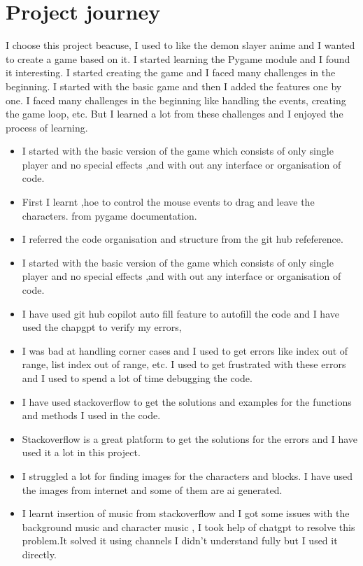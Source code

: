 \documentclass[12pt]{article}
\begin{document}
\section{Project journey}
I choose this project beacuse, I used to like the demon slayer anime and I wanted to create a game based on it. I started learning the Pygame module and I found it interesting. I started creating the game and I faced many challenges in the beginning. I started with the basic game and then I added the features one by one. I faced many challenges in the beginning like handling the events, creating the game loop, etc. But I learned a lot from these challenges and I enjoyed the process of learning.
\begin{itemize}
    \item I started with the basic version of the game which consists of only single player and no special effects ,and with out any interface or organisation of code.
    \item First I learnt ,hoe to control the mouse events to drag and leave the characters. from pygame documentation.\cite{pygame}
    \item I referred the code organisation and structure from the git hub refeference.\cite{github}
    \item I started with the basic version of the game which consists of only single player and no special effects ,and with out any interface or organisation of code.
    \item I have used git hub copilot auto fill feature to autofill the code and I have used the chapgpt to verify my errors,
    \item I was bad at handling corner cases and I used to get errors like index out of range, list index out of range, etc. I used to get frustrated with these errors and I used to spend a lot of time debugging the code.
    \item I have used stackoverflow to get the solutions and examples for the functions and methods I used in the code.\cite{stackoverflow}
    \item Stackoverflow is a great platform to get the solutions for the errors and I have used it a lot in this project.
    \item I struggled a lot for finding images for the characters and blocks. I have used the images from internet and some of them are ai generated.
    \item I learnt insertion of music from stackoverflow and I got some issues with the background music and character music , I took help of chatgpt to resolve this problem.It solved it using channels I didn't understand fully but I used it directly.

\end{itemize}
\end{document}
